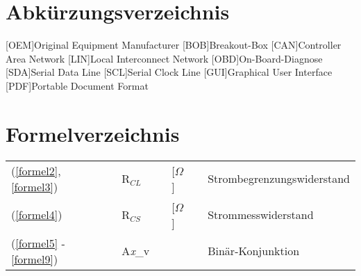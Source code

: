 \documentclass[a4paper,oneside,12pt]{report}
\renewcommand{\lstlistingname}{Programmcode}
\renewcommand{\lstlistlistingname}{\lstlistingname}
\begin{document}
\clearpage
{}
\listoffigures
\clearpage
\renewcommand{\lstlistingname}{Programmcodeverzeichnis}
\lstlistoflistings
\renewcommand{\lstlistlistingname}{\lstlistingname}

\chapter*{Abkürzungsverzeichnis}
\vspace{1.0cm}
\begin{acronym}[SEPSEP]
	[OEM]{Original Equipment Manufacturer}
	[BOB]{Breakout-Box}
	[CAN]{Controller Area Network}
	[LIN]{Local Interconnect Network}
	[OBD]{On-Board-Diagnose}	
	[SDA]{Serial Data Line}
	[SCL]{Serial Clock Line}
	[GUI]{Graphical User Interface}
	[PDF]{Portable Document Format}
\end{acronym}

\chapter*{Formelverzeichnis}
\vspace{1.0cm}
\begin{center}
	\begin{tabularx}{\textwidth}{lXlXlXl}
		
		(\ref{formel2}, \ref{formel3})	& & R$_{CL}$ & & [$\Omega$]	& & Strombegrenzungswiderstand\\
		
		(\ref{formel4})	& & R$_{CS}$ & & [$\Omega$]	& & Strommesswiderstand\\
		
		(\ref{formel5} - \ref{formel9})	& & A\textit{x}\_v & & & & Binär-Konjunktion\\
		
	\end{tabularx}
\end{center}
\end{document}
